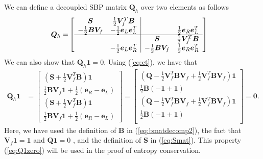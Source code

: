 \documentclass[review,onefignum,onetabnum,final]{siamart171218}
\newcommand{\LRp}[1]{\left( #1 \right)}
\newcommand{\LRs}[1]{\left[ #1 \right]}
\begin{document}
We can define a decoupled SBP matrix $\bm{Q}_h$ over two elements as follows
\begin{align}
\bm{Q}_h =& \LRs{\begin{array}{cc|cc}
\bm{S} &  \frac{1}{2}\bm{V}_f^T\bm{B} & & \\
 -\frac{1}{2}\bm{B}\bm{V}_f & -\frac{1}{2}\bm{e}_L\bm{e}_L^T & & \frac{1}{2}\bm{e}_R\bm{e}_L^T\\
 \hline
&& \bm{S} & \frac{1}{2}\bm{V}_f^T\bm{B} \\
& -\frac{1}{2}\bm{e}_L\bm{e}_R^T & - \frac{1}{2}\bm{B}\bm{V}_f & \frac{1}{2}\bm{e}_R\bm{e}_R^T
\end{array}} \label{eq:decoupledsbp2elem}
\end{align}
We can also show that $\bm{Q}_h\bm{1} = 0$.  Using (\ref{eq:et}), we have that
\begin{align}
\bm{Q}_h\bm{1} &= \begin{bmatrix}
\LRp{\bm{S} + \frac{1}{2}\bm{V}_f^T\bm{B} }\bm{1}\\
\frac{1}{2}\bm{B}\bm{V}_f\bm{1} + \frac{1}{2}\LRp{\bm{e}_R-\bm{e}_L}\\
\LRp{\bm{S} + \frac{1}{2}\bm{V}_f^T\bm{B} }\bm{1}\\
\frac{1}{2}\bm{B}\bm{V}_f\bm{1} + \frac{1}{2}\LRp{\bm{e}_R-\bm{e}_L}
\end{bmatrix} 
= 
\begin{bmatrix}
\LRp{\bm{Q} - \frac{1}{2}\bm{V}_f^T\bm{B}\bm{V}_f + \frac{1}{2}\bm{V}_f^T\bm{B}\bm{V}_f}\bm{1}\\
\frac{1}{2}\bm{B}\LRp{-\bm{1} + \bm{1}}\\
\LRp{\bm{Q} - \frac{1}{2}\bm{V}_f^T\bm{B}\bm{V}_f + \frac{1}{2}\bm{V}_f^T\bm{B}\bm{V}_f}\bm{1}\\
\frac{1}{2}\bm{B}\LRp{-\bm{1} + \bm{1}}\\
\end{bmatrix} = \bm{0}.
\label{eq:Q1zero}
\end{align}
Here, we have used the definition of $\bm{B}$ in (\ref{eq:bmatdecomp2}), the fact that $\bm{V}_f\bm{1} = \bm{1}$ and $\bm{Q}\bm{1} = 0$ \cite{fernandez2014generalized}, and the definition of $\bm{S}$ in (\ref{eq:Smat}).  This property (\ref{eq:Q1zero}) will be used in the proof of entropy conservation.  
\end{document}
